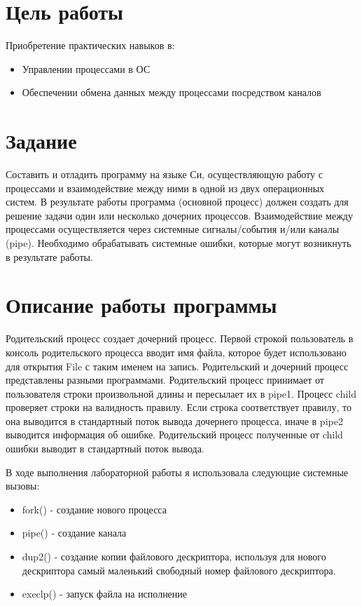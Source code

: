 \documentclass[a4paper, 12pt]{article}
\begin{document}
\section{Цель работы}
Приобретение практических навыков в:
\begin{itemize}
  \item Управлении процессами в ОС
  \item Обеспечении обмена данных между процессами посредством каналов
\end{itemize}

\section{Задание}
Составить и отладить программу на языке Си, осуществляющую работу с процессами и 
взаимодействие между ними в одной из двух операционных систем. В результате работы 
программа (основной процесс) должен создать для решение задачи один или несколько 
дочерних процессов. Взаимодействие между процессами осуществляется через системные 
сигналы/события и/или каналы (pipe).
Необходимо обрабатывать системные ошибки, которые могут возникнуть в результате работы.

\section{Описание работы программы}
Родительский процесс создает дочерний процесс. Первой строкой пользователь в консоль родительского процесса вводит имя файла, которое будет использовано для открытия File с таким 
именем на запись. Родительский и дочерний процесс представлены разными программами. Родительский процесс принимает от пользователя строки произвольной длины и пересылает их в 
pipe1. Процесс child проверяет строки на валидность правилу. Если строка соответствует правилу, то она выводится в стандартный поток вывода дочернего процесса, иначе в pipe2 выводится информация об ошибке. Родительский процесс полученные от child ошибки выводит в стандартный поток вывода.

В ходе выполнения лабораторной работы я использовала следующие системные вызовы:
\begin{itemize}
  \item fork() - создание нового процесса
  \item pipe() - создание канала
  \item dup2() - создание копии файлового дескриптора, используя для нового дескриптора самый маленький свободный номер файлового дескриптора.
  \item execlp() - запуск файла на исполнение
\end{itemize}
\end{document}
